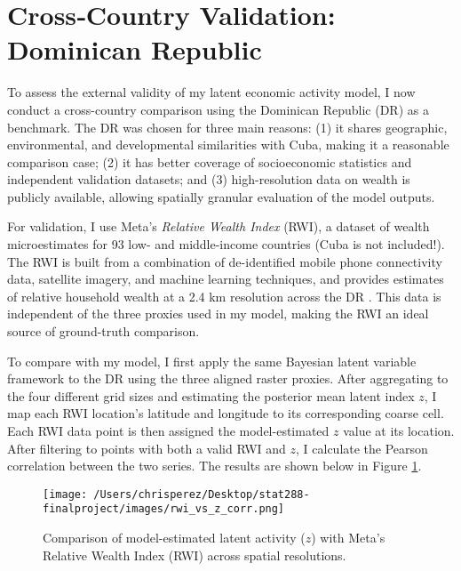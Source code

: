 \documentclass[12pt]{article}
\begin{document}
  
  
  
  
  
  
  
  


\section{Cross‑Country Validation: Dominican Republic}
\label{sec:validation}

To assess the external validity of my latent economic activity model, I now conduct a cross-country comparison using the Dominican Republic (DR) as a benchmark. The DR was chosen for three main reasons: (1) it shares geographic, environmental, and developmental similarities with Cuba, making it a reasonable comparison case; (2) it has better coverage of socioeconomic statistics and independent validation datasets; and (3) high-resolution data on wealth is publicly available, allowing spatially granular evaluation of the model outputs.

For validation, I use Meta's \textit{Relative Wealth Index} (RWI), a dataset of wealth microestimates for 93 low- and middle-income countries (Cuba is not included!). The RWI is built from a combination of de-identified mobile phone connectivity data, satellite imagery, and machine learning techniques, and provides estimates of relative household wealth at a 2.4 km resolution across the DR \parencite{chi2022microestimates}. This data is independent of the three proxies used in my model, making the RWI an ideal source of ground-truth comparison.

To compare with my model, I first apply the same Bayesian latent variable framework to the DR using the three aligned raster proxies. After aggregating to the four different grid sizes and estimating the posterior mean latent index \( z \), I map each RWI location's latitude and longitude to its corresponding coarse cell. Each RWI data point is then assigned the model-estimated \( z \) value at its location. After filtering to points with both a valid RWI and \( z \), I calculate the Pearson correlation between the two series. The results are shown below in Figure \ref{fig:rwi_validation}.

\begin{figure}[H]
  \centering
  \texttt{[image: /Users/chrisperez/Desktop/stat288-finalproject/images/rwi\_vs\_z\_corr.png]}
  \caption{Comparison of model-estimated latent activity ($z$) with Meta’s Relative Wealth Index (RWI) across spatial resolutions.}
  \label{fig:rwi_validation}
\end{figure}
\end{document}
